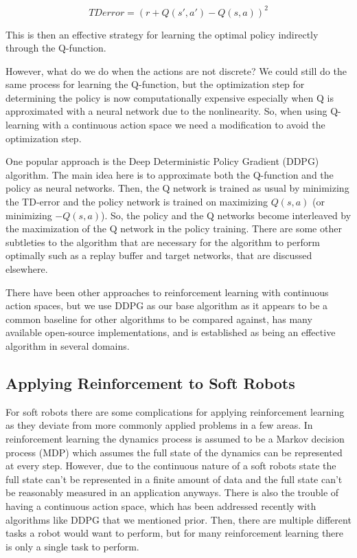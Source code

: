\documentclass[letterpaper, 10 pt, conference]{ieeeconf}  %
\begin{document}
\begin{equation}
    TD error = (r+Q(s',a') - Q(s,a))^2
\end{equation}

This is then an effective strategy for learning the optimal policy indirectly through the Q-function.

However, what do we do when the actions are not discrete? We could still do the same process for learning the Q-function, but the optimization step for determining the policy is now computationally expensive especially when Q is approximated with a neural network due to the nonlinearity. So, when using Q-learning with a continuous action space we need a modification to avoid the optimization step.

One popular approach is the Deep Deterministic Policy Gradient (DDPG) algorithm. The main idea here is to approximate both the Q-function and the policy as neural networks. Then, the Q network is trained as usual by minimizing the TD-error and the policy network is trained on maximizing $Q(s,a)$ (or minimizing $-Q(s,a)$). So, the policy and the Q networks become interleaved by the maximization of the Q network in the policy training. There are some other subtleties to the algorithm that are necessary for the algorithm to perform optimally such as a replay buffer and target networks, that are discussed elsewhere. 

There have been other approaches to reinforcement learning with continuous action spaces, but we use DDPG as our base algorithm as it appears to be a common baseline for other algorithms to be compared against, has many available open-source implementations, and is established as being an effective algorithm in several domains.

\subsection{Applying Reinforcement to Soft Robots}

For soft robots there are some complications for applying reinforcement learning as they deviate from more commonly applied problems in a few areas. In reinforcement learning the dynamics process is assumed to be a Markov decision process (MDP) which assumes the full state of the dynamics can be represented at every step. However, due to the continuous nature of a soft robots state the full state can't be represented in a finite amount of data and the full state can't be reasonably measured in an application anyways. There is also the trouble of having a continuous action space, which has been addressed recently with algorithms like DDPG that we mentioned prior. Then, there are multiple different tasks a robot would want to perform, but for many reinforcement learning there is only a single task to perform. 
\end{document}
